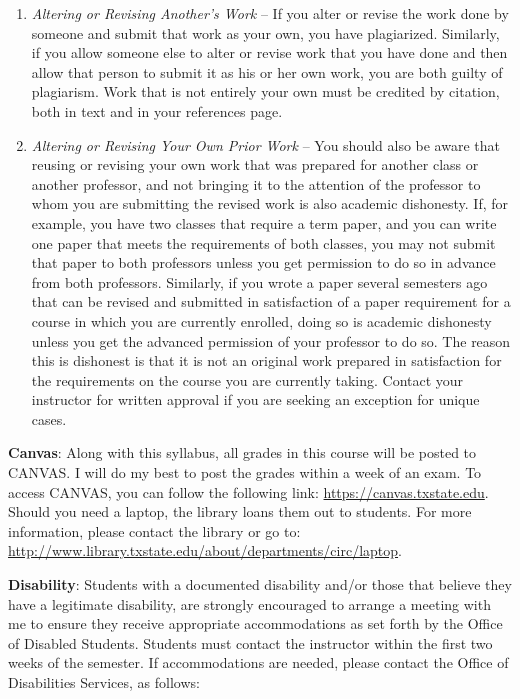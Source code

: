 \documentclass[11pt,]{article}
\begin{document}
\begin{enumerate}
\item
  \emph{Altering or Revising Another's Work} -- If you alter or revise
  the work done by someone and submit that work as your own, you have
  plagiarized. Similarly, if you allow someone else to alter or revise
  work that you have done and then allow that person to submit it as his
  or her own work, you are both guilty of plagiarism. Work that is not
  entirely your own must be credited by citation, both in text and in
  your references page.
\item
  \emph{Altering or Revising Your Own Prior Work} -- You should also be
  aware that reusing or revising your own work that was prepared for
  another class or another professor, and not bringing it to the
  attention of the professor to whom you are submitting the revised work
  is also academic dishonesty. If, for example, you have two classes
  that require a term paper, and you can write one paper that meets the
  requirements of both classes, you may not submit that paper to both
  professors unless you get permission to do so in advance from both
  professors. Similarly, if you wrote a paper several semesters ago that
  can be revised and submitted in satisfaction of a paper requirement
  for a course in which you are currently enrolled, doing so is academic
  dishonesty unless you get the advanced permission of your professor to
  do so. The reason this is dishonest is that it is not an original work
  prepared in satisfaction for the requirements on the course you are
  currently taking. Contact your instructor for written approval if you
  are seeking an exception for unique cases.
\end{enumerate}

\textbf{Canvas}: Along with this syllabus, all grades in this course
will be posted to CANVAS. I will do my best to post the grades within a
week of an exam. To access CANVAS, you can follow the following link:
\url{https://canvas.txstate.edu}. Should you need a laptop, the library
loans them out to students. For more information, please contact the
library or go to:
\url{http://www.library.txstate.edu/about/departments/circ/laptop}.

\textbf{Disability}: Students with a documented disability and/or those
that believe they have a legitimate disability, are strongly encouraged
to arrange a meeting with me to ensure they receive appropriate
accommodations as set forth by the Office of Disabled Students. Students
must contact the instructor within the first two weeks of the semester.
If accommodations are needed, please contact the Office of Disabilities
Services, as follows:
\end{document}

